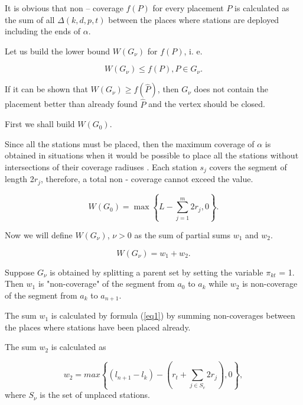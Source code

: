 It is obvious that non – coverage $f(P)$ for every placement $P$ is calculated as the sum of all $\Delta(k,d,p,t)$ between the places where stations are deployed including the ends of $\alpha$.

Let us build the lower bound $W(G_\nu)$ for $f(P)$, i. e.

\begin{displaymath}
W(G_\nu) \leq f(P), P \in G_\nu. 
\end{displaymath}

If it can be shown that $W(G_\nu) \geq f(\widehat{P})$, then $G_\nu$ does not contain the placement better than already found $\widehat{P}$ and the vertex should be closed.
 
First we shall build $W(G_0)$.

Since all the stations must be placed, then the maximum coverage of $\alpha$ is obtained in situations when  it would be possible to place all the stations without intersections of their coverage radiuses . Each station $s_j$ covers the segment of length 2$r_j$, therefore, a total non - coverage cannot exceed the value.

\begin{displaymath}
W\left(G_0\right) = \max{\left\{L-\sum_{j=1}^{m}{2r_j,0}\right\}}.                                                                                  
\end{displaymath}

Now we will define $W(G_\nu)$, $\nu > 0$ as the sum of partial sums $w_1$ and $w_2$. 

\begin{displaymath}
W\left(G_\nu\right) = w_1 + w_2.                                                                                  
\end{displaymath}

Suppose $G_\nu$ is obtained by splitting a parent set by setting the variable $\pi_{kt}$ = 1. Then $w_1$ is "non-coverage" of the segment from $a_0$ to $a_k$ while $w_2$ is non-coverage of the segment from $a_k$ to $a_{n+1}$.

The sum $w_1$ is calculated by formula (\ref{eq1}) by summing non-coverages between the places where stations have been placed already. 

The sum $w_2$ is calculated as

\begin{equation}\label{eq2}
w_2 = max\left\{\left(l_{n+1}-l_k\right)-\left(r_t+\sum_{j\in S_v}{2r_j}\right),0\right\},
\end{equation}
where $S_\nu$ is the set of unplaced stations. 

